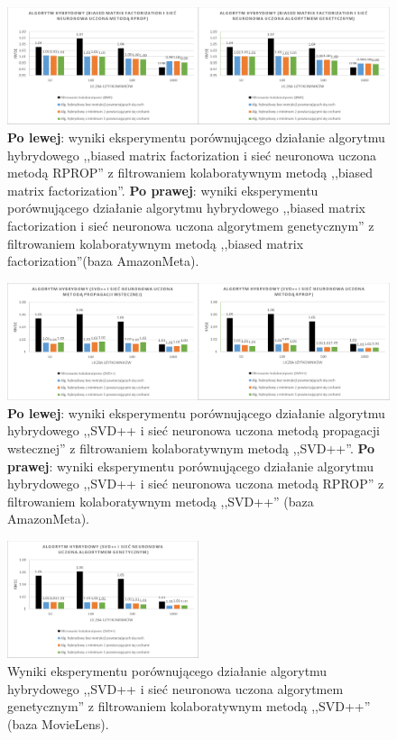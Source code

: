 \documentclass[twoside]{iisthesis}
\begin{document}
		\begin{figure}
			\centering
			\includegraphics[width=1\textwidth]{am_exphybrid2_3}			
			\caption{\textbf{Po lewej}: wyniki eksperymentu porównującego działanie algorytmu hybrydowego ,,biased matrix factorization i sieć neuronowa uczona metodą RPROP'' z filtrowaniem kolaboratywnym metodą ,,biased matrix factorization''. \textbf{Po prawej}: wyniki eksperymentu porównującego działanie algorytmu hybrydowego ,,biased matrix factorization i sieć neuronowa uczona algorytmem genetycznym'' z filtrowaniem kolaboratywnym metodą ,,biased matrix factorization''(baza AmazonMeta).}
			\label{fig:am_exphybrid2_3}
		\end{figure}
		
		\begin{figure}
			\centering
			\includegraphics[width=1\textwidth]{am_exphybrid2_4}			
			\caption{\textbf{Po lewej}: wyniki eksperymentu porównującego działanie algorytmu hybrydowego ,,SVD++ i sieć neuronowa uczona metodą propagacji wstecznej'' z filtrowaniem kolaboratywnym metodą ,,SVD++''. \textbf{Po prawej}: wyniki eksperymentu porównującego działanie algorytmu hybrydowego ,,SVD++ i sieć neuronowa uczona metodą RPROP'' z filtrowaniem kolaboratywnym metodą ,,SVD++'' (baza AmazonMeta).}
			\label{fig:am_exphybrid2_4}
		\end{figure}
		
		\begin{figure}
			\centering
			\includegraphics[width=0.5\textwidth]{am_exphybrid2_5}			
			\caption{Wyniki eksperymentu porównującego działanie algorytmu hybrydowego ,,SVD++ i sieć neuronowa uczona algorytmem genetycznym'' z filtrowaniem kolaboratywnym metodą ,,SVD++'' (baza MovieLens).}
			\label{fig:am_exphybrid2_5}
		\end{figure}
		
\end{document}
